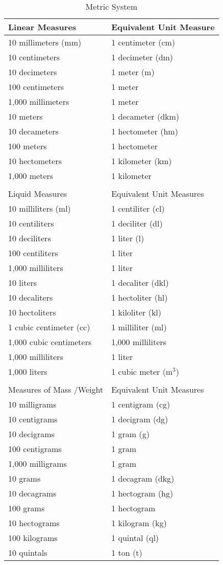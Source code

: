 \begin{table}
\centering
\caption{Metric System}
\begin{tabular}{ll}
\hline \hline
Linear Measures & Equivalent Unit Measure\\
\hline
10 millimeters (mm) & 1 centimeter (cm)\\
10 centimeters & 1 decimeter (dm)\\
10 decimeters & 1 meter (m)\\
100 centimeters & 1 meter\\
1,000 millimeters & 1 meter\\
10 meters &1 decameter (dkm)\\
10 decameters &1 hectometer (hm)\\
100 meters &1 hectometer\\
10 hectometers &1 kilometer (km)\\
1,000 meters &1 kilometer\\
\hline
 & \\
\hline
\hline
Liquid Measures &Equivalent Unit Measures\\
\hline
10 milliliters (ml) &1 centiliter (cl)\\
10 centiliters &1 deciliter (dl)\\
10 deciliters &1 liter (l)\\
100 centiliters &1 liter\\
1,000 milliliters &1 liter\\
10 liters &1 decaliter (dkl)\\
10 decaliters &1 hectoliter (hl)\\
10 hectoliters &1 kiloliter (kl)\\
1 cubic centimeter (cc) &1 milliliter (ml)\\
1,000 cubic centimeters &1,000 milliliters\\
1,000 milliliters &1 liter\\
1,000 liters &1 cubic meter (m$^3$)\\
\hline
& \\
\hline
\hline
Measures of Mass /Weight &Equivalent Unit Measures\\
\hline
10 milligrams &1 centigram (cg)\\
10 centigrams &1 decigram (dg)\\
10 decigrams &1 gram (g)\\
100 centigrams &1 gram\\
1,000 milligrams &1 gram\\
10 grams &1 decagram (dkg)\\
10 decagrams &1 hectogram (hg)\\
100 grams &1 hectogram\\
10 hectograms &1 kilogram (kg)\\
100 kilograms &1 quintal (ql)\\
10 quintals &1 ton (t)\\
\hline
\end{tabular}
\label{chap3tab:2}
\end{table}

